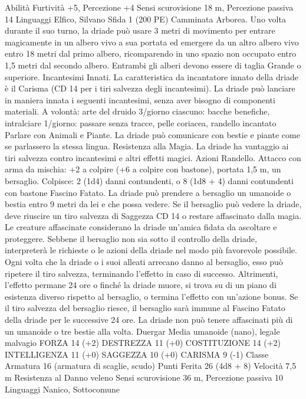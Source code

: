 \begin{multicols}{2}
Abilità Furtività +5, Percezione +4
Sensi scurovisione 18 m, Percezione passiva 14
Linguaggi Elfico, Silvano
Sfida 1 (200 PE)
Camminata Arborea. Uno volta durante il suo turno, la driade
può usare 3 metri di movimento per entrare magicamente in un
albero vivo a sua portata ed emergere da un altro albero vivo
entro 18 metri dal primo albero, ricomparendo in uno spazio non
occupato entro 1,5 metri dal secondo albero. Entrambi gli alberi
devono essere di taglia Grande o superiore.
Incantesimi Innati. La caratteristica da incantatore innato della
driade è il Carisma (CD 14 per i tiri salvezza degli incantesimi).
La driade può lanciare in maniera innata i seguenti incantesimi,
senza aver bisogno di componenti materiali.
A volontà: arte del druido
3/giorno ciascuno: bacche benefiche, intralciare
1/giorno: passare senza tracce, pelle coriacea, randello
incantato
Parlare con Animali e Piante. La driade può comunicare con
bestie e piante come se parlassero la stessa lingua.
Resistenza alla Magia. La driade ha vantaggio ai tiri salvezza
contro incantesimi e altri effetti magici.
Azioni
Randello. Attacco con arma da mischia: +2 a colpire (+6 a
colpire con bastone), portata 1,5 m, un bersaglio.
Colpisce: 2 (1d4) danni contundenti, o 8 (1d8 + 4) danni
contundenti con bastone
Fascino Fatato. La driade può prendere a bersaglio un umanoide o
bestia entro 9 metri da lei e che possa vedere. Se il bersaglio può
vedere la driade, deve riuscire un tiro salvezza di Saggezza CD 14 o
restare affascinato dalla magia. Le creature affascinate considerano la
driade un’amica fidata da ascoltare e proteggere. Sebbene il bersaglio
non sia sotto il controllo della driade, interpreterà le richieste o le
azioni della driade nel modo più favorevole possibile.
Ogni volta che la driade o i suoi alleati arrecano danno al bersaglio,
esso può ripetere il tiro salvezza, terminando l’effetto in caso di
successo. Altrimenti, l’effetto permane 24 ore o finché la driade
muore, si trova su di un piano di esistenza diverso rispetto al
bersaglio, o termina l’effetto con un’azione bonus. Se il tiro salvezza
del bersaglio riesce, il bersaglio sarà immune al Fascino Fatato della
driade per le successive 24 ore.
La driade non può tenere affascinati più di un umanoide o tre bestie
alla volta.
Duergar
Media umanoide (nano), legale malvagio
FORZA 14 (+2)
DESTREZZA 11 (+0)
COSTITUZIONE 14 (+2)
INTELLIGENZA 11 (+0)
SAGGEZZA 10 (+0)
CARISMA 9 (-1)
Classe Armatura 16 (armatura di scaglie, scudo)
Punti Ferita 26 (4d8 + 8)
Velocità 7,5 m
Resistenza al Danno veleno
Sensi scurovisione 36 m, Percezione passiva 10
Linguaggi Nanico, Sottocomune

\end{multicols}
